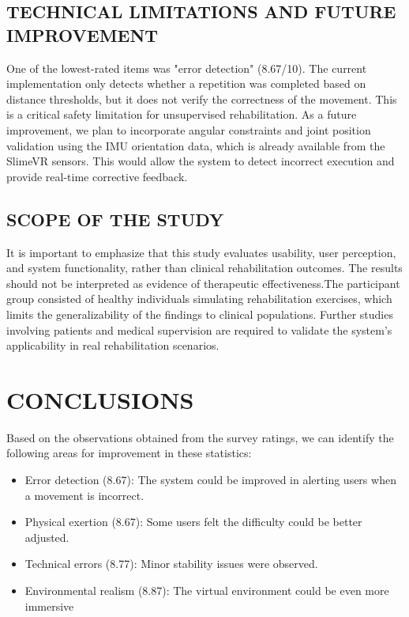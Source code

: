 \documentclass[a4paper,twoside]{article}
\begin{document}
\subsection{\uppercase{Technical Limitations and Future Improvement}}
One of the lowest-rated items was "error detection" (8.67/10). The current implementation only detects whether a repetition was completed based on distance thresholds, but it does not verify the correctness of the movement. This is a critical safety limitation for unsupervised rehabilitation. As a future improvement, we plan to incorporate angular constraints and joint position validation using the IMU orientation data, which is already available from the SlimeVR sensors. This would allow the system to detect incorrect execution and provide real-time corrective feedback. 

\subsection{\uppercase{Scope of the Study}}
It is important to emphasize that this study evaluates usability, user perception, and system functionality, rather than clinical rehabilitation outcomes. The results should not be interpreted as evidence of therapeutic effectiveness.The participant group consisted of healthy individuals simulating rehabilitation exercises, which limits the generalizability of the findings to clinical populations. Further studies involving patients and medical supervision are required to validate the system’s applicability in real rehabilitation scenarios.


\section{\uppercase{Conclusions}}

Based on the observations obtained from the survey ratings, we can identify the following areas for
improvement in these statistics:

\begin{itemize}
    \item Error detection (8.67): The system could be improved in alerting users when a movement is incorrect.
    \item Physical exertion (8.67): Some users felt the difficulty could be better adjusted.
    \item Technical errors (8.77): Minor stability issues were observed.
    \item Environmental realism (8.87): The virtual environment could be even more immersive
\end{itemize}
\end{document}

